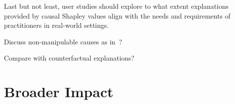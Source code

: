 \documentclass{article}
\newcommand{\vx}{\mathbf{x}}
\newcommand{\expectation}{\mathbb{E}}
\newcommand{\comment}[1]{{\color{red} #1}}
\begin{document}
%
%



Last but not least, user studies should explore to what extent explanations provided by causal Shapley values align with the needs and requirements of practitioners in real-world settings.

\comment{Discuss non-manipulable causes as in~\cite{pearl2018obesity}?}
	


\comment{Compare with counterfactual explanations?}

\section*{Broader Impact}


\end{document}
